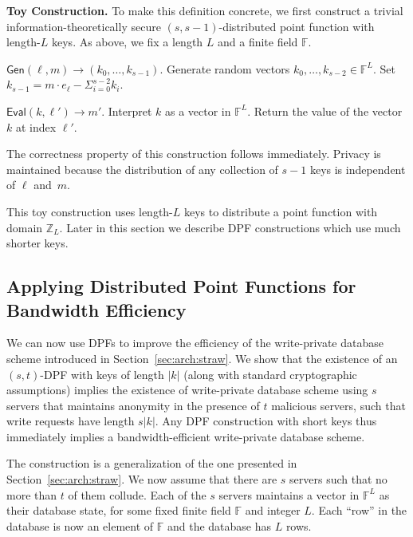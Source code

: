 \documentclass[10pt,twocolumn]{article}
\newcommand{\Z}{\mathbb{Z}}
\newcommand{\F}{\mathbb{F}}
\newcommand{\nicepara}[1]{\medskip\noindent\textbf{#1.}}
\begin{document}
\medskip

\nicepara{Toy Construction}
To make this definition concrete,
we first construct a trivial information-theoretically secure 
\mbox{$(s, s-1)$}-distributed point function with length-$L$ keys.
As above, we fix a length $L$ and a finite field $\F$.

\begin{compactitem}
\item
$\mathsf{Gen}(\ell, m) \rightarrow (k_0, \dots, k_{s-1})$.
Generate random vectors $k_0, \dots, k_{s-2} \in \F^L$.
Set $k_{s-1} = m \cdot e_{\ell} - \Sigma_{i=0}^{s-2} k_i$.

\item
$\mathsf{Eval}(k, \ell') \rightarrow m'$.
Interpret $k$ as a vector in $\F^L$.
Return the value of the vector $k$ at index $\ell'$.

\end{compactitem}
The correctness property of this
construction follows immediately.
Privacy is maintained because the distribution of
any collection of $s-1$ keys is independent of $\ell$ and~$m$.

This toy construction uses length-$L$ keys to distribute
a point function with domain $\Z_L$.
Later in this section we describe 
DPF constructions which use much shorter keys.

\subsection{Applying Distributed Point Functions for Bandwidth Efficiency}

We can now use DPFs to improve the efficiency of the
write-private database scheme introduced in Section~\ref{sec:arch:straw}.
We show that the existence of an $(s,t)$-DPF with keys of length 
$|k|$ (along with standard cryptographic assumptions) implies
the existence of write-private database scheme using $s$ servers
that maintains anonymity in the presence of $t$ malicious servers,
such that write requests have length $s|k|$.
Any DPF construction with short keys thus immediately implies 
a bandwidth-efficient write-private database scheme.

The construction is a generalization of the one presented
in Section~\ref{sec:arch:straw}.
We now assume that there are $s$ servers such that no more than $t$
of them collude.
Each of the $s$ servers maintains a vector in $\F^L$ as their
database state, for some fixed 
finite field $\F$ and integer $L$.
Each ``row'' in the database is now an element of $\F$ and the database
has $L$ rows.
\end{document}
